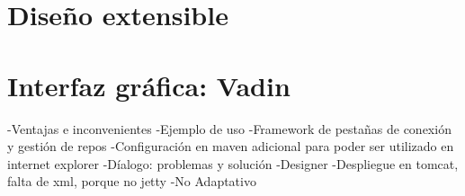 \section{Diseño extensible}

\section{Interfaz gráfica: Vadin}
-Ventajas e inconvenientes
-Ejemplo de uso
-Framework de pestañas de conexión y gestión de repos
-Configuración en maven adicional para poder ser utilizado en internet explorer
-Díalogo: problemas y solución
-Designer
-Despliegue en tomcat, falta de xml, porque no jetty
-No Adaptativo